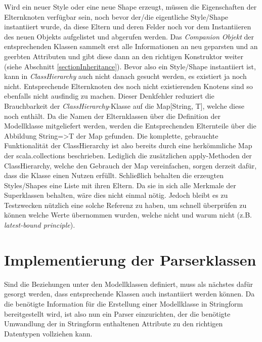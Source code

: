 Wird ein neuer Style oder eine neue Shape erzeugt, müssen die Eigenschaften der Elternknoten verfügbar sein, noch bevor der/die eigentliche Style/Shape instantiiert wurde, da diese Eltern und deren Felder noch vor dem Instantiieren des neuen Objekts aufgelistet und abgerufen werden. Das \textit{Companion Objekt} der entsprechenden Klassen sammelt erst alle Informationen an neu geparsten und an geerbten Attributen und gibt diese dann an den richtigen Konstruktor weiter (siehe Abschnitt \ref{sectionInheritance}). Bevor also ein Style/Shape instantiiert ist, kann in \textit{ClassHierarchy} auch nicht danach gesucht werden, es existiert ja noch nicht. Entsprechende Elternknoten des noch nicht existierenden Knotens sind so ebenfalls nicht ausfindig zu machen. Dieser Denkfehler reduziert die Brauchbarkeit der \textit{ClassHierarchy}-Klasse auf die Map[String, T], welche diese noch enthält. Da die Namen der Elternklassen über die Definition der Modellklasse mitgeliefert werden, werden die Entsprechenden Elternteile über die Abbildung String=\textgreater T der Map gefunden.
Die komplette, gebrauchte Funktionalität der ClassHierarchy ist also bereits durch eine herkömmliche Map der scala.collections beschrieben. Lediglich die zusätzlichen apply-Methoden der ClassHierarchy, welche den Gebrauch der Map vereinfachen, sorgen derzeit dafür, dass die Klasse einen Nutzen erfüllt. Schließlich behalten die erzeugten Styles/Shapes eine Liste mit ihren Eltern. Da sie in sich alle Merkmale der Superklassen behalten, wäre dies nicht einmal nötig. Jedoch bleibt es zu Testzwecken nützlich eine solche Referenz zu haben, um schnell überprüfen zu können welche Werte übernommen wurden, welche nicht und warum nicht (z.B. \textit{latest-bound principle}).
\section{Implementierung der Parserklassen}
Sind die Beziehungen unter den Modellklassen definiert, muss als nächstes dafür gesorgt werden, dass entsprechende Klassen auch instantiiert werden können. Da die benötigte Information für die Erstellung einer Modellklasse in Stringform bereitgestellt wird, ist also nun ein Parser einzurichten, der die benötigte Umwandlung der in Stringform enthaltenen Attribute zu den richtigen Datentypen vollziehen kann.
